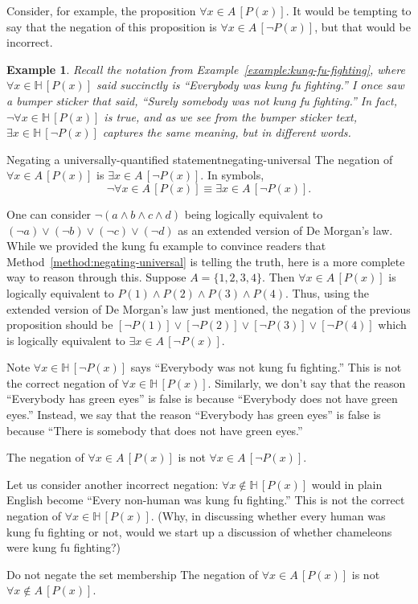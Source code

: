 \documentclass{book}
\newcounter{ekcounter}%
\theoremstyle{ekimcustom}
\newtheorem{example}[ekcounter]{Example}
\begin{document}
Consider, for example, the proposition $\forall x \in A\,[P(x)]$. It would be tempting to say that the negation of this proposition is $\forall x \in A\,[\neg P(x)]$, but that would be incorrect.
\begin{example}
Recall the notation from Example~\ref{example:kung-fu-fighting}, where $\forall x \in \mathbb{H}\,[P(x)]$ said succinctly is ``Everybody was kung fu fighting.''
I once saw a bumper sticker that said, ``Surely \emph{somebody} was not kung fu fighting.'' In fact, $\neg \forall x \in \mathbb{H}\,[P(x)]$ is true, and as we see from the bumper sticker text, $\exists x \in \mathbb{H}\,[\neg P(x)]$ captures the same meaning, but in different words.
\end{example}
\begin{bmethod}{Negating a universally-quantified statement}{negating-universal}
The negation of $\forall x \in A\,[P(x)]$ is $\exists x \in A\,[\neg P(x)]$. In symbols,
\[ \neg \forall x \in A\,[P(x)] \equiv \exists x \in A\,[\neg P(x)].\]
\end{bmethod}

One can consider $\neg(a \wedge b \wedge c \wedge d)$ being logically equivalent to $(\neg a) \vee (\neg b) \vee (\neg c) \vee (\neg d)$ as an extended version of De Morgan's law. While we provided the kung fu example to convince readers that Method~\ref{method:negating-universal} is telling the truth, here is a more complete way to reason through this. Suppose $A = \{1,2,3,4\}$. Then $\forall x \in A\,[P(x)]$ is logically equivalent to $P(1) \wedge P(2) \wedge P(3) \wedge P(4)$. Thus, using the extended version of De Morgan's law just mentioned, the negation of the previous proposition should be $[\neg P(1)] \vee [\neg P(2)] \vee [\neg P(3)] \vee [\neg P(4)]$ which is logically equivalent to $\exists x \in A\,[\neg P(x)]$.

Note $\forall x \in \mathbb{H}\,[\neg P(x)]$ says ``Everybody was not kung fu fighting.'' This is not the correct negation of $\forall x \in \mathbb{H}\,[P(x)]$. Similarly, we don't say that the reason ``Everybody has green eyes'' is false is because ``Everybody does not have green eyes.'' Instead, we say that the reason ``Everybody has green eyes'' is false is because ``There is somebody that does not have green eyes.''
\begin{bwarning}{}{}
The negation of $\forall x \in A\,[P(x)]$ is not $\forall x \in A\,[\neg P(x)]$.
\end{bwarning}

Let us consider another incorrect negation: $\forall x \not\in \mathbb{H}\,[P(x)]$ would in plain English become ``Every non-human was kung fu fighting.'' This is not the correct negation of $\forall x \in \mathbb{H}\,[P(x)]$. (Why, in discussing whether every human was kung fu fighting or not, would we start up a discussion of whether chameleons were kung fu fighting?)
\begin{bwarning}{Do not negate the set membership}{}
The negation of $\forall x \in A\,[P(x)]$ is not $\forall x \not\in A\,[P(x)]$.
\end{bwarning}
\end{document}
